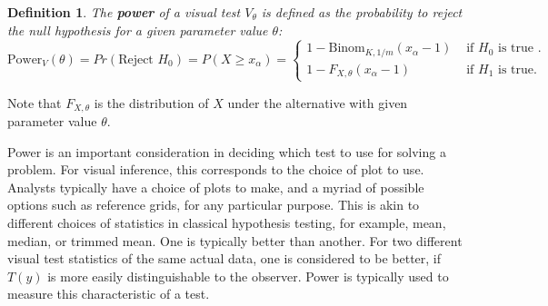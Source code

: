 \documentclass{article}
\newcommand{\red}[1]{{\color{red} #1}} %
\newtheorem{dfn}{Definition}[section]
\begin{document}
%
%
\begin{dfn} \label{dfn:power}
The \textbf{power} of a visual test $V_{\theta}$ is defined as the probability to reject the null hypothesis for a given parameter value $\theta$:
    \begin{equation*}
      \text{Power}_V(\theta)= Pr(\text{Reject } H_0) = P(X \ge x_{\alpha}) = 
        \begin{cases} 
               1 - \text{Binom}_{K, 1/m}(x_{\alpha} - 1) & \text{ if } H_0 \text{ is true }.\\
              1 - F_{X, \theta} (x_{\alpha} - 1) & \text{ if } H_1 \text{ is true}.
        \end{cases}
    \end{equation*}
\end{dfn}

\noindent Note that $F_{X, \theta}$ is the distribution of $X$ under the alternative with given parameter value $\theta$.

Power is an important consideration in deciding which test to use for solving a problem. %
For visual inference, this corresponds to the choice of plot to use. Analysts typically have a choice of plots to make, and a myriad of possible options such as reference grids, for any particular purpose. This is akin to different choices of statistics in classical hypothesis testing, for example, mean, median, or trimmed mean. One is typically better than another. For two different visual test statistics of the same actual data, one is considered to be better, if $T(y)$ is more easily distinguishable to the observer. Power is typically used to measure this characteristic of a test. %
\end{document}
